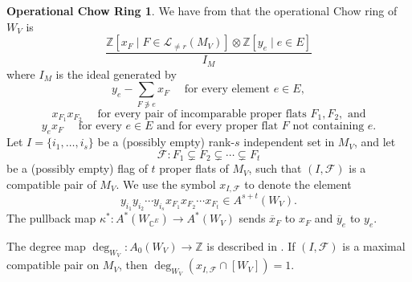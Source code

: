 \documentclass{amsart}
\theoremstyle{plain}
\theoremstyle{definition}
\newtheorem{opchowring}[theorem]{Operational Chow Ring}
\begin{document}
\begin{opchowring}
We have from \cite[Remark 2.16]{semismall} 
that the operational Chow ring of $W_V$ is
\begin{equation*}    
\frac{\mathbb{Z}[x_F \mid F \in \mathcal{L}_{\neq r} (M_V)] \otimes \mathbb{Z} [y_e \mid e \in E]}{I_M}
\end{equation*}
where $I_M$ is the ideal generated by
\begin{equation}
\label{eq:ideal_description_1}
\tag{R1}
y_e - \sum_{F\not\ni e} x_F \quad \text{ for every element } e \in E,
\end{equation}
\begin{equation}
\label{eq:ideal_description_2}
\tag{R2}
x_{F_1}x_{F_2} \quad \text{ for every pair of incomparable proper flats } F_1, F_2, \text{ and}
\end{equation}
\begin{equation}
\label{eq:ideal_description_3}
\tag{R3}
y_ex_F \quad \text{ for every $e \in E$ and for every proper flat $F$ not containing $e$.}
\end{equation}
Let $I = \{i_1,\dots,i_s\}$ be a (possibly empty) rank-$s$ independent set in $M_V$, and let 
\[\mathscr{F}:F_{1} \subsetneq F_{2} \subsetneq \cdots \subsetneq F_{t}\]
be a (possibly empty) flag of $t$ proper flats of $M_V$, such that $(I, \mathscr{F})$ is a compatible pair of $M_V$. We use the symbol $x_{I, \mathscr{F}}$ to denote the element
\[y_{i_1}y_{i_2}\cdots y_{i_s} x_{F_1}x_{F_2}\cdots x_{F_t} \in A^{s+t}(W_V).\]
The pullback map ${\kappa}^*: A^*(W_{\mathbb{C}^E}) \to A^*(W_V)$ sends $\overline{x}_F$ to $x_F$ and $\overline{y}_e$ to $y_e$.
\end{opchowring}

The degree map $\deg_{W_V}: A_0(W_V) \to \mathbb{Z}$ is described in \cite[Definition 2.15]{semismall}. If $(I, \mathscr{F})$ is a maximal compatible pair on $M_V$, then $\deg_{W_V}(x_{I, \mathscr{F}} \cap [W_V])=1.$
\end{document}
